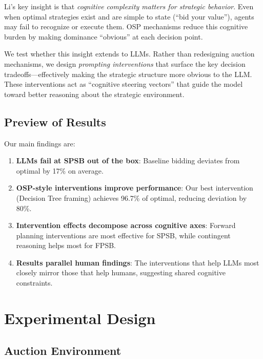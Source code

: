 \documentclass[12pt]{article}
\begin{document}
Li's key insight is that \emph{cognitive complexity matters for strategic behavior}. Even when optimal strategies exist and are simple to state (``bid your value''), agents may fail to recognize or execute them. OSP mechanisms reduce this cognitive burden by making dominance ``obvious'' at each decision point.

We test whether this insight extends to LLMs. Rather than redesigning auction mechanisms, we design \emph{prompting interventions} that surface the key decision tradeoffs---effectively making the strategic structure more obvious to the LLM. These interventions act as ``cognitive steering vectors'' that guide the model toward better reasoning about the strategic environment.

\subsection{Preview of Results}

Our main findings are:

\begin{enumerate}
    \item \textbf{LLMs fail at SPSB out of the box}: Baseline bidding deviates from optimal by 17\% on average.

    \item \textbf{OSP-style interventions improve performance}: Our best intervention (Decision Tree framing) achieves 96.7\% of optimal, reducing deviation by 80\%.

    \item \textbf{Intervention effects decompose across cognitive axes}: Forward planning interventions are most effective for SPSB, while contingent reasoning helps most for FPSB.

    \item \textbf{Results parallel human findings}: The interventions that help LLMs most closely mirror those that help humans, suggesting shared cognitive constraints.
\end{enumerate}

\section{Experimental Design}

\subsection{Auction Environment}
\end{document}
